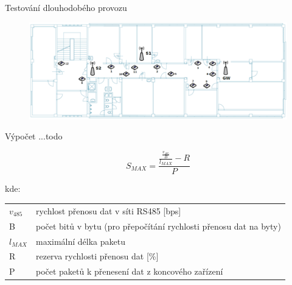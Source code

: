 \documentclass{beamer}
\begin{document}
  \begin{frame} {Testování dlouhodobého provozu}

	\begin{figure}[!h]
		\centering
		\includegraphics[width=1\textwidth]{5patro}
	\end{figure}

  \end{frame}


  \begin{frame} {Výpočet ...todo}

	{\fontsize{9}{9}\selectfont 
	\begin{equation}
		S_{MAX} = \frac{\frac{\frac{v_{485}}{B}}{l_{MAX}} - R}{P}
		\label{equ:max-count-of-sensors}
		\end{equation}
		
		kde:
		
		\begin{tabular}{l @{  } l}
		$v_{485}$ & rychlost přenosu dat v síti RS485 [bps]\\
		B        & počet bitů v bytu (pro přepočítání rychlosti přenosu dat na byty) \\
		$l_{MAX}$ & maximální délka paketu \\
		R        & rezerva rychlosti přenosu dat [\%]\\
		P        & počet paketů k přenesení dat z koncového zařízení \\
	\end{tabular}
	}

  \end{frame}
\end{document}

